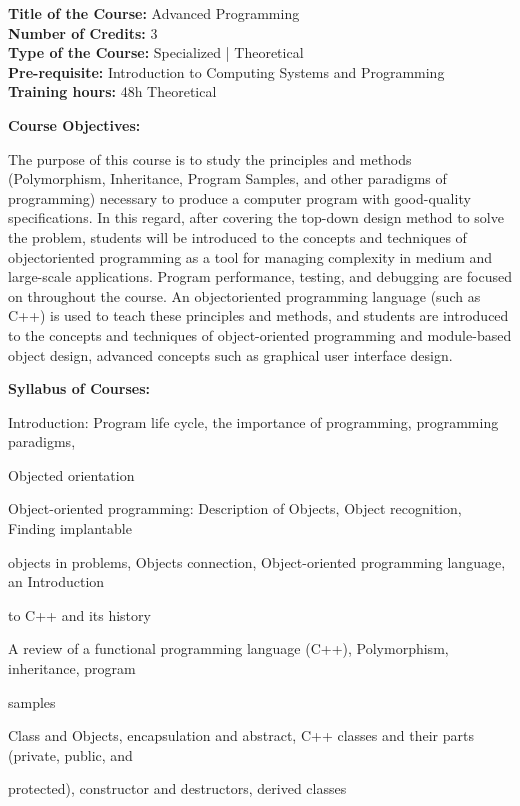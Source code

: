 \documentclass[12pt,a4paper]{article}
\begin{document}
\newpage
\textbf{Title of the Course:} Advanced Programming\\
\textbf{Number of Credits:} 3\\
\textbf{Type of the Course:} Specialized | Theoretical\\
\textbf{Pre-requisite:} Introduction to Computing Systems and Programming\\
\textbf{Training hours:} 48h Theoretical\par\vspace{4pt}
\textbf{Course Objectives:}\par\vspace{2pt}
The purpose of this course is to study the principles and methods (Polymorphism, Inheritance,
Program Samples, and other paradigms of programming) necessary to produce a computer
program with good-quality specifications. In this regard, after covering the top-down design
method to solve the problem, students will be introduced to the concepts and techniques of objectoriented programming as a tool for managing complexity in medium and large-scale applications.
Program performance, testing, and debugging are focused on throughout the course. An objectoriented programming language (such as C++) is used to teach these principles and methods, and
students are introduced to the concepts and techniques of object-oriented programming and
module-based object design, advanced concepts such as graphical user interface design.\par\vspace{4pt}
\textbf{Syllabus of Courses:}\par\vspace{2pt}
Introduction: Program life cycle, the importance of programming, programming paradigms,\par
Objected orientation\par
Object-oriented programming: Description of Objects, Object recognition, Finding implantable\par
objects in problems, Objects connection, Object-oriented programming language, an Introduction\par
to C++ and its history\par
A review of a functional programming language (C++), Polymorphism, inheritance, program\par
samples\par
Class and Objects, encapsulation and abstract, C++ classes and their parts (private, public, and\par
protected), constructor and destructors, derived classes\par
\end{document}
